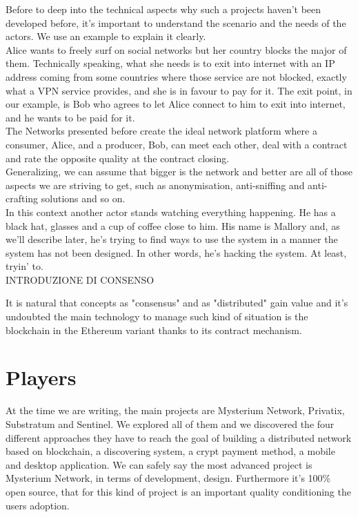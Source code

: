 \documentclass[]{article}
\begin{document}
	Before to deep into the technical aspects why such a projects haven't been developed before, it's important to understand the scenario and the needs of the actors. We use an example to explain it clearly.\\
	Alice wants to freely surf on social networks but her country blocks the major of them. Technically speaking, what she needs is to exit into internet with an IP address coming from some countries where those service are not blocked, exactly what a VPN service provides, and she is in favour to pay for it. 
	The exit point, in our example, is Bob who agrees to let Alice connect to him to exit into internet, and he wants to be paid for it.\\
	The Networks presented before create the ideal network platform where a consumer, Alice, and a producer, Bob, can meet each other, deal with a contract and rate the opposite quality at the contract closing.\\
	Generalizing, we can assume that bigger is the network and better are all of those aspects we are striving to get, such as anonymisation, anti-sniffing and anti-crafting solutions and so on.\\
	In this context another actor stands watching everything happening. He has a black hat, glasses and a cup of coffee close to him. His name is Mallory and, as we'll describe later, he's trying to find ways to use the system in a manner the system has not been designed. In other words, he's hacking the system. At least, tryin' to.\\
	
	INTRODUZIONE DI CONSENSO 
	
	It is natural that concepts as "consensus" and as "distributed" gain value and it's undoubted the main technology to manage such kind of situation is the blockchain in the Ethereum variant thanks to its contract mechanism.\\
	
	
	\section{Players}
	At the time we are writing, the main projects are Mysterium Network, Privatix, Substratum and Sentinel. We explored all of them and we discovered the four different approaches they have to reach the goal of building a distributed network based on blockchain, a discovering system, a crypt payment method, a mobile and desktop application. We can safely say the most advanced project is Mysterium Network, in terms of development, design. Furthermore it's 100\% open source, that for this kind of project is an important quality conditioning the users adoption.
\end{document}
